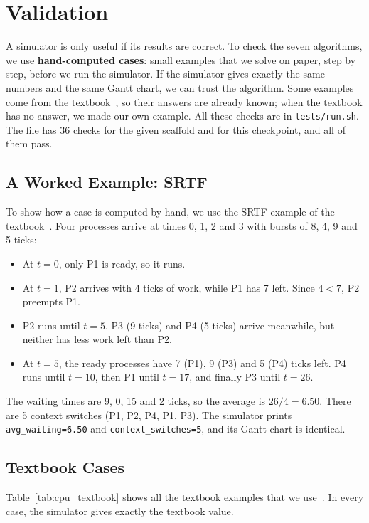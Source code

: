 \section{Validation}
\label{sec:validation}
A simulator is only useful if its results are correct. To check the seven algorithms, we use \textbf{hand-computed cases}: small examples that we solve on paper, step by step, before we run the simulator. If the simulator gives exactly the same numbers and the same Gantt chart, we can trust the algorithm. Some examples come from the textbook~\cite{silberschatz}, so their answers are already known; when the textbook has no answer, we made our own example. All these checks are in \texttt{tests/run.sh}. The file has 36 checks for the given scaffold and for this checkpoint, and all of them pass.

\subsection{A Worked Example: SRTF}
To show how a case is computed by hand, we use the SRTF example of the textbook~\cite[Sec.~5.3.2]{silberschatz}. Four processes arrive at times 0, 1, 2 and 3 with bursts of 8, 4, 9 and 5 ticks:
\begin{itemize}
    \item At $t=0$, only P1 is ready, so it runs.
    \item At $t=1$, P2 arrives with 4 ticks of work, while P1 has 7 left. Since $4 < 7$, P2 preempts P1.
    \item P2 runs until $t=5$. P3 (9 ticks) and P4 (5 ticks) arrive meanwhile, but neither has less work left than P2.
    \item At $t=5$, the ready processes have 7 (P1), 9 (P3) and 5 (P4) ticks left. P4 runs until $t=10$, then P1 until $t=17$, and finally P3 until $t=26$.
\end{itemize}
The waiting times are 9, 0, 15 and 2 ticks, so the average is $26/4 = 6.50$. There are 5 context switches (P1, P2, P4, P1, P3). The simulator prints \texttt{avg\_waiting=6.50} and \texttt{context\_switches=5}, and its Gantt chart is identical.

\subsection{Textbook Cases}
Table~\ref{tab:cpu_textbook} shows all the textbook examples that we use~\cite[Sec.~5.3]{silberschatz}. In every case, the simulator gives exactly the textbook value.

